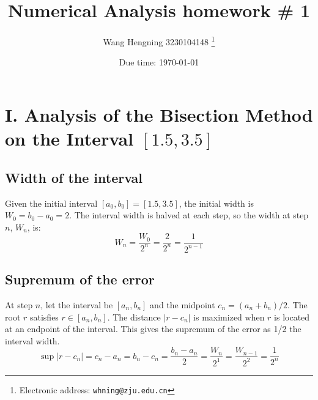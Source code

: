 \documentclass[a4paper]{article}
\begin{document}
\title{Numerical Analysis homework \# 1}
\author{Wang Hengning 3230104148
  \thanks{Electronic address: \texttt{whning@zju.edu.cn}}}


\date{Due time: \today}

\maketitle




\section*{I. Analysis of the Bisection Method on the Interval $[1.5, 3.5]$}

\subsection*{Width of the interval}

Given the initial interval $[a_0, b_0] = [1.5, 3.5]$, the initial width is $W_0 = b_0 - a_0 = 2$.
The interval width is halved at each step, so the width at step $n$, $W_n$, is:
\[
W_n = \frac{W_0}{2^n} = \frac{2}{2^n} = \frac{1}{2^{n-1}}
\]

\subsection*{Supremum of the error}

At step $n$, let the interval be $[a_n, b_n]$ and the midpoint $c_n = (a_n+b_n)/2$. The root $r$ satisfies $r \in [a_n, b_n]$.
The distance $|r - c_n|$ is maximized when $r$ is located at an endpoint of the interval.
This gives the supremum of the error as 1/2 the interval width.
\[
\sup|r - c_n| = c_n - a_n = b_n - c_n = \frac{b_n - a_n}{2} = \frac{W_n}{2^1} = \frac{W_{n-1}}{2^2} = \frac{1}{2^n}
\]
\end{document}

